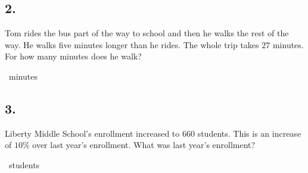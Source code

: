\documentclass[12pt]{article}
\newenvironment{answer}{\vspace{1em}}{}
\newenvironment{answer}{\vspace{0em}\expandafter\comment}{\expandafter\endcomment}
\newlength{\currentparskip}
\newlength{\currentparindent}
\newenvironment{minipagex}[2][]
  {\setlength{\currentparskip}{\parskip}%
    \setlength{\currentparindent}{\parindent}%
   \begin{minipage}[#1]{#2}%
   \setlength{\parskip}{\currentparskip}%
   \setlength{\parindent}{\currentparindent}%
  }
  {\end{minipage}}
\begin{document}
\subsection*{2.}
Tom rides the bus part of the way to school and then he walks the rest of the way. He walks five minutes longer than he rides. The whole trip takes $27$ minutes. For how many minutes does he walk?

\fbox{\phantom{ANSWER}}~minutes

\begin{answer}
%
\end{answer}


\subsection*{3.}
Liberty Middle School's enrollment increased to $660$ students. This is an increase of $10\%$ over last year's enrollment. What was last year's enrollment?

\fbox{\phantom{ANSWER}}~students
\end{document}
